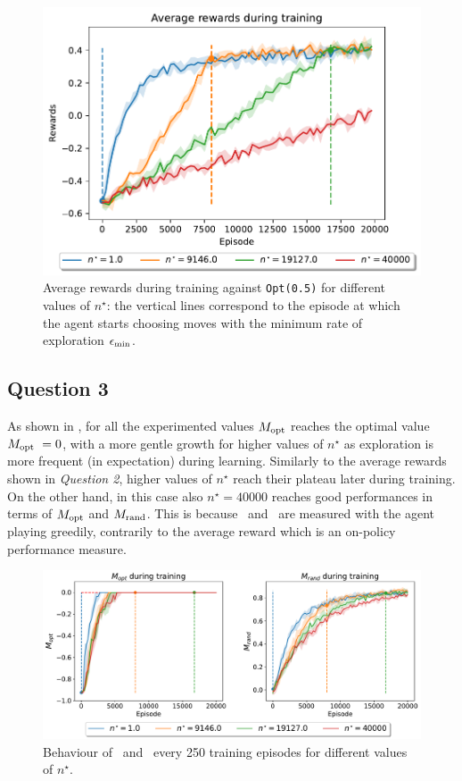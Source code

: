 \documentclass[10pt]{IEEEtran}
\begin{document}
\begin{figure}[h]
    \centering
    \includegraphics[width = 0.85\linewidth]{code/figures/rewards_n_star.pdf}
    \caption{Average rewards during training against \texttt{Opt(0.5)} for different values of $n^{\star}$: the vertical lines correspond to the episode at which the agent starts choosing moves with the minimum rate of exploration $\epsilon_{\text{min}}$.}%
    \label{plot_question2}
\end{figure}

\subsection*{Question 3}
As shown in , for all the experimented values $M_{\text{opt}}$ reaches the optimal value $M_{\text{opt}} \ = 0$, with a more gentle growth for higher values of $n^{\star}$ as exploration is more frequent (in expectation) during learning. Similarly to the average rewards shown in \emph{Question 2}, higher values of $n^{\star}$ reach their plateau later during training. On the other hand, in this case also $n^{\star} = 40000$ reaches good performances in terms of $M_{\text{opt}}$ and $M_{\text{rand}}$. This is because \mopt\ and \mrand\ are measured with the agent playing greedily, contrarily to the average reward which is an on-policy performance measure.

\begin{figure}[h]
    \centering
    \includegraphics[width=\linewidth]{code/figures/performance_n_star.pdf}
    \caption{Behaviour of \mopt\  and \mrand\  every 250 training episodes for different values of $n^{\star}$.}
    \label{plot_question3}
\end{figure}
\end{document}
